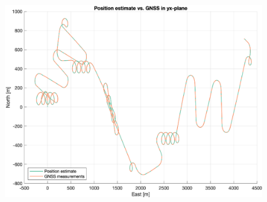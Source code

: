 \begin{figure}[!htb]
    \centering
    \includegraphics[width=0.6\linewidth]{figures/ga_2/sim_trajectory.eps}
    \caption{}
    \label{fig:ga_2_sim_trajectory}
\end{figure}

